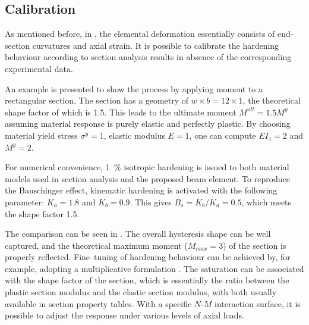 \subsection{Calibration}
As mentioned before, in , the elemental deformation essentially consists of end-section curvatures and axial strain. It is possible to calibrate the hardening behaviour according to section analysis results in absence of the corresponding experimental data.

An example is presented to show the process by applying moment to a rectangular section.
The section has a geometry of $w\times{}b=12\times1$, the theoretical shape factor of which is \num{1.5}.
This leads to the ultimate moment $M^{ult}=1.5M^y$ assuming material response is purely elastic and perfectly plastic.
By choosing material yield stress $\sigma^y=1$, elastic modulus $E=1$, one can compute $EI_z=2$ and $M^y=2$.

For numerical convenience, \SI{1}{\percent} isotropic hardening is issued to both material models used in section analysis and the proposed beam element.
To reproduce the Bauschinger effect, kinematic hardening is activated with the following parameter: $K_a=1.8$ and $K_b=0.9$.
This gives $B_s=K_b/K_a=0.5$, which meets the shape factor \num{1.5}.

The comparison can be seen in .
The overall hysteresis shape can be well captured, and the theoretical maximum moment ($M_{max}=3$) of the section is properly reflected.
Fine--tuning of hardening behaviour can be achieved by, for example, adopting a multiplicative formulation \citep{Chaboche1989}.
The saturation can be associated with the shape factor of the section, which is essentially the ratio between the plastic section modulus and the elastic section modulus, with both usually available in section property tables.
With a specific $N$-$M$ interaction surface, it is possible to adjust the response under various levels of axial loads.
